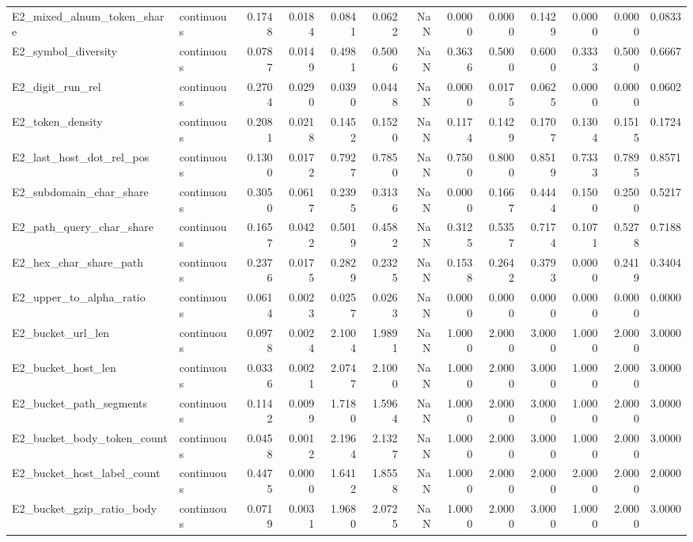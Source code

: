 \begin{tabular}{llrrrrrrrrrrr}
E2\_mixed\_alnum\_token\_share & continuous & 0.1748 & 0.0184 & 0.0841 & 0.0622 & NaN & 0.0000 & 0.0000 & 0.1429 & 0.0000 & 0.0000 & 0.0833 \\
E2\_symbol\_diversity & continuous & 0.0787 & 0.0149 & 0.4981 & 0.5006 & NaN & 0.3636 & 0.5000 & 0.6000 & 0.3333 & 0.5000 & 0.6667 \\
E2\_digit\_run\_rel & continuous & 0.2704 & 0.0290 & 0.0390 & 0.0448 & NaN & 0.0000 & 0.0175 & 0.0625 & 0.0000 & 0.0000 & 0.0602 \\
E2\_token\_density & continuous & 0.2081 & 0.0218 & 0.1452 & 0.1520 & NaN & 0.1174 & 0.1429 & 0.1707 & 0.1304 & 0.1515 & 0.1724 \\
E2\_last\_host\_dot\_rel\_pos & continuous & 0.1300 & 0.0172 & 0.7927 & 0.7850 & NaN & 0.7500 & 0.8000 & 0.8519 & 0.7333 & 0.7895 & 0.8571 \\
E2\_subdomain\_char\_share & continuous & 0.3050 & 0.0617 & 0.2395 & 0.3136 & NaN & 0.0000 & 0.1667 & 0.4444 & 0.1500 & 0.2500 & 0.5217 \\
E2\_path\_query\_char\_share & continuous & 0.1657 & 0.0422 & 0.5019 & 0.4582 & NaN & 0.3125 & 0.5357 & 0.7174 & 0.1071 & 0.5278 & 0.7188 \\
E2\_hex\_char\_share\_path & continuous & 0.2376 & 0.0175 & 0.2829 & 0.2325 & NaN & 0.1538 & 0.2642 & 0.3793 & 0.0000 & 0.2419 & 0.3404 \\
E2\_upper\_to\_alpha\_ratio & continuous & 0.0614 & 0.0023 & 0.0257 & 0.0263 & NaN & 0.0000 & 0.0000 & 0.0000 & 0.0000 & 0.0000 & 0.0000 \\
E2\_bucket\_url\_len & continuous & 0.0978 & 0.0024 & 2.1004 & 1.9891 & NaN & 1.0000 & 2.0000 & 3.0000 & 1.0000 & 2.0000 & 3.0000 \\
E2\_bucket\_host\_len & continuous & 0.0336 & 0.0021 & 2.0747 & 2.1000 & NaN & 1.0000 & 2.0000 & 3.0000 & 1.0000 & 2.0000 & 3.0000 \\
E2\_bucket\_path\_segments & continuous & 0.1142 & 0.0099 & 1.7180 & 1.5964 & NaN & 1.0000 & 2.0000 & 3.0000 & 1.0000 & 2.0000 & 3.0000 \\
E2\_bucket\_body\_token\_count & continuous & 0.0458 & 0.0012 & 2.1964 & 2.1327 & NaN & 1.0000 & 2.0000 & 3.0000 & 1.0000 & 2.0000 & 3.0000 \\
E2\_bucket\_host\_label\_count & continuous & 0.4475 & 0.0000 & 1.6412 & 1.8558 & NaN & 1.0000 & 2.0000 & 2.0000 & 2.0000 & 2.0000 & 2.0000 \\
E2\_bucket\_gzip\_ratio\_body & continuous & 0.0719 & 0.0031 & 1.9680 & 2.0725 & NaN & 1.0000 & 2.0000 & 3.0000 & 1.0000 & 2.0000 & 3.0000 \\

\end{tabular}
